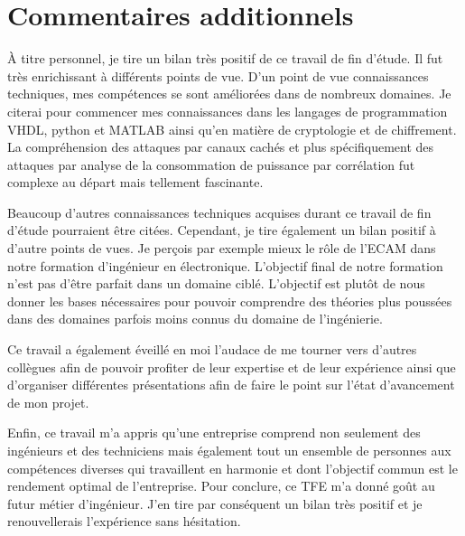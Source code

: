 \documentclass[oneside]{book}
\begin{document}
\section{Commentaires additionnels}

À titre personnel, je tire un bilan très positif de ce travail de fin d'étude. Il fut très enrichissant à différents points de vue. D'un point de vue connaissances techniques, mes compétences se sont améliorées dans de nombreux domaines. Je citerai pour commencer mes connaissances dans les langages de programmation VHDL, python et MATLAB ainsi qu'en matière de cryptologie et de chiffrement. La compréhension des attaques par canaux cachés et plus spécifiquement des attaques par analyse de la consommation de puissance par corrélation fut complexe au départ mais tellement fascinante. 

Beaucoup d'autres connaissances techniques acquises durant ce travail de fin d'étude pourraient être citées. Cependant, je tire également un bilan positif à d'autre points de vues. Je perçois par exemple mieux le rôle de l'ECAM dans notre formation d'ingénieur en électronique. L'objectif final de notre formation n'est pas d'être parfait dans un domaine ciblé. L'objectif est plutôt de nous donner les bases nécessaires pour pouvoir comprendre des théories plus poussées dans des domaines parfois moins connus du domaine de l'ingénierie.

Ce travail a également éveillé en moi l’audace de me tourner vers d'autres collègues afin de pouvoir profiter de leur expertise et de leur expérience ainsi que d'organiser différentes présentations afin de faire le point sur l'état d'avancement de mon projet.

Enfin, ce travail m'a appris qu'une entreprise comprend non seulement des ingénieurs et des techniciens mais également tout un ensemble de personnes aux compétences diverses qui travaillent en harmonie et dont l'objectif commun est le rendement optimal de l'entreprise. Pour conclure, ce TFE m’a donné goût au futur métier d’ingénieur. J'en tire par conséquent un bilan très positif et je renouvellerais l’expérience sans hésitation.



\newpage



{}

\nocite{*}


\end{document}
